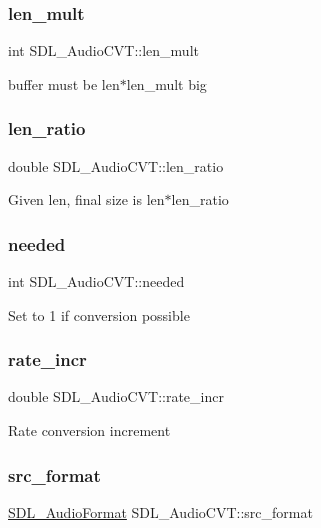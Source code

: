 \subsubsection{\texorpdfstring{len\_mult}{len\_mult}}
{\footnotesize\ttfamily int S\+D\+L\+\_\+\+Audio\+C\+V\+T\+::len\+\_\+mult}

buffer must be len$\ast$len\+\_\+mult big \mbox{\label{struct_s_d_l___audio_c_v_t_a5628ff5ccf711de9d77c0a4a9f57d2f0}} 
\subsubsection{\texorpdfstring{len\_ratio}{len\_ratio}}
{\footnotesize\ttfamily double S\+D\+L\+\_\+\+Audio\+C\+V\+T\+::len\+\_\+ratio}

Given len, final size is len$\ast$len\+\_\+ratio \mbox{\label{struct_s_d_l___audio_c_v_t_ac600a035a48df05e14d3712fd6953ad4}} 
\subsubsection{\texorpdfstring{needed}{needed}}
{\footnotesize\ttfamily int S\+D\+L\+\_\+\+Audio\+C\+V\+T\+::needed}

Set to 1 if conversion possible \mbox{\label{struct_s_d_l___audio_c_v_t_ad886122c23a6673073baace31bff3b6c}} 
\subsubsection{\texorpdfstring{rate\_incr}{rate\_incr}}
{\footnotesize\ttfamily double S\+D\+L\+\_\+\+Audio\+C\+V\+T\+::rate\+\_\+incr}

Rate conversion increment \mbox{\label{struct_s_d_l___audio_c_v_t_a6ae81231e017105e6d5e745a51732e16}} 
\subsubsection{\texorpdfstring{src\_format}{src\_format}}
{\footnotesize\ttfamily \mbox{\hyperlink{_s_d_l__audio_8h_a491ed103fd25d920c4e6b7495217ce66}{S\+D\+L\+\_\+\+Audio\+Format}} S\+D\+L\+\_\+\+Audio\+C\+V\+T\+::src\+\_\+format}

